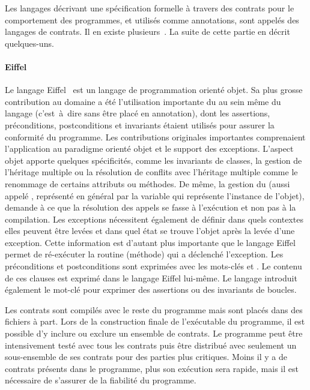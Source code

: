 Les langages décrivant une spécification formelle à travers des contrats pour le
comportement des programmes, et utilisés comme annotations, sont appelés des
{\strong langages de contrats}. Il en existe plusieurs~.
La suite de cette partie en décrit quelques-uns.

\paragraph{Eiffel} Le langage Eiffel~ est un langage de
programmation orienté objet. Sa plus grosse contribution au domaine a été
l'utilisation importante du  au sein même du
langage (c'est~à~dire sans être placé en annotation), dont les assertions,
préconditions, postconditions et invariants étaient utilisés pour assurer la
conformité du programme. Les contributions originales importantes comprenaient
l'application au paradigme orienté objet et le support des exceptions. L'aspect
objet apporte quelques spécificités, comme les invariants de classes, la gestion
de l'héritage multiple ou la résolution de conflits avec l'héritage multiple
comme le renommage de certains attributs ou méthodes. De même, la gestion du
 (aussi appelé , représenté
en général par la variable  qui représente l'instance de l'objet),
demande à ce que la résolution des appels se fasse à l'exécution et non pas à la
compilation. Les exceptions nécessitent également de définir dans quels
contextes elles peuvent être levées et dans quel état se trouve l'objet après la
levée d'une exception. Cette information est d'autant plus importante que le
langage Eiffel permet de ré-exécuter la routine (méthode) qui a déclenché
l'exception. Les préconditions et postconditions sont exprimées avec les
mots-clés  et . Le contenu de ces clauses est exprimé
dans le langage Eiffel lui-même. Le langage introduit également le mot-clé
 pour exprimer des assertions ou des invariants de boucles.

Les contrats sont compilés avec le reste du programme mais sont placés dans des
fichiers à part. Lors de la construction finale de l'exécutable du programme, il
est possible d'y inclure ou exclure un ensemble de contrats. Le programme peut
être intensivement testé avec tous les contrats puis être distribué avec
seulement un sous-ensemble de ses contrats pour des parties plus critiques.
Moins il y a de contrats présents dans le programme, plus son exécution sera
rapide, mais il est nécessaire de s'assurer de la fiabilité du programme.

